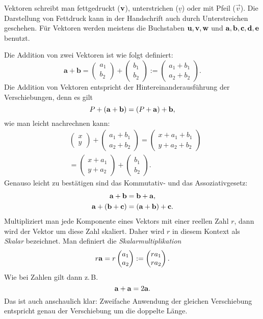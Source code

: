 Vektoren schreibt man fettgedruckt ($\mathbf{v}$), unterstrichen
($\underline v$) oder mit Pfeil ($\vec v$). Die Darstellung von
Fettdruck kann in der Handschrift auch durch Unterstreichen geschehen.
Für Vektoren werden meistens die Buchstaben $\mathbf{u},\mathbf{v},\mathbf{w}$
und $\mathbf{a},\mathbf{b},\mathbf{c},\mathbf{d},\mathbf{e}$ benutzt.

Die Addition von zwei Vektoren ist wie folgt definiert:%
\[\mathbf a+\mathbf b = \begin{pmatrix}a_1\\ b_2\end{pmatrix}
+\begin{pmatrix}b_1\\ b_2\end{pmatrix}
:= \begin{pmatrix}a_1+b_1\\ a_2+b_2\end{pmatrix}.\]
Die Addition von Vektoren entspricht der Hintereinanderausführung
der Verschiebungen, denn es gilt%
\[P+(\mathbf{a}+\mathbf{b}) = (P+\mathbf{a})+\mathbf{b},\]
wie man leicht nachrechnen kann:
\begin{align*}
&\begin{pmatrix}x\\ y\end{pmatrix}
+ \begin{pmatrix}a_1+b_1\\ a_2+b_2\end{pmatrix}
= \begin{pmatrix}x+a_1+b_1\\ y+a_2+b_2\end{pmatrix}\\
&= \begin{pmatrix}x+a_1\\ y+a_2\end{pmatrix}
+ \begin{pmatrix}b_1\\ b_2\end{pmatrix}.
\end{align*}
Genauso leicht zu bestätigen sind das Kommutativ-
und das Assoziativgesetz:%
\begin{gather*}
\mathbf{a}+\mathbf{b} = \mathbf{b}+\mathbf{a},\\
\mathbf{a}+(\mathbf{b}+\mathbf{c}) = (\mathbf{a}+\mathbf{b})+\mathbf{c}.
\end{gather*}
Multipliziert man jede Komponente eines Vektors mit einer reellen
Zahl $r$, dann wird der Vektor um diese Zahl skaliert. Daher
wird $r$ in diesem Kontext als \emph{Skalar} bezeichnet. Man
definiert die \emph{Skalarmultiplikation}%
\[r\mathbf{a} = r\begin{pmatrix}a_1\\ a_2\end{pmatrix}
:= \begin{pmatrix}ra_1\\ ra_2\end{pmatrix}.\]
Wie bei Zahlen gilt dann z.\,B.
\[\mathbf{a}+\mathbf{a} = 2\mathbf{a}.\]
Das ist auch anschaulich klar: Zweifache Anwendung der gleichen
Verschiebung entspricht genau der Verschiebung um die doppelte Länge.

